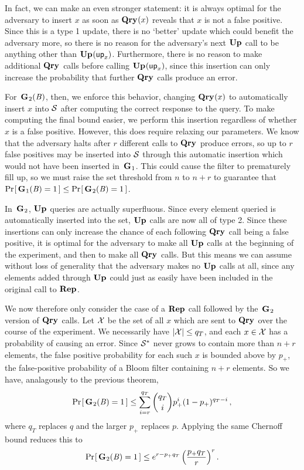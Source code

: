 In fact, we can make an even stronger statement: it is always optimal for the adversary to insert $x$ as soon as $\textup{\textbf{Qry}}\hspace{0.5pt}(x)$ reveals that $x$ is not a false positive. Since this is a type 1 update, there is no `better' update which could benefit the adversary more, so there is no reason for the adversary's next $\textup{\textbf{Up}}\hspace{0.5pt}$ call to be anything other than $\textup{\textbf{Up}}\hspace{0.5pt}(\mathsf{up}_x)$. Furthermore, there is no reason to make additional $\textup{\textbf{Qry}}\hspace{0.5pt}$ calls before calling $\textup{\textbf{Up}}\hspace{0.5pt}(\mathsf{up}_x)$, since this insertion can only increase the probability that further $\textup{\textbf{Qry}}\hspace{0.5pt}$ calls produce an error.

For~$\textup{\textbf{G}}\hspace{0.5pt}_2(\mathit{B})$, then, we enforce this behavior, changing $\textup{\textbf{Qry}}\hspace{0.5pt}(x)$ to automatically insert $x$ into $\mathcal{S}$ after computing the correct response to the query. To make computing the final bound easier, we perform this insertion regardless of whether $x$ is a false positive. However, this does require relaxing our parameters. We know that the adversary halts after $r$ different calls to $\textup{\textbf{Qry}}\hspace{0.5pt}$ produce errors, so up to $r$ false positives may be inserted into $\mathcal{S}$ through this automatic insertion which would not have been inserted in~$\textup{\textbf{G}}\hspace{0.5pt}_1$. This could cause the filter to prematurely fill up, so we must raise the set threshold from $n$ to $n+r$ to guarantee that $\Pr\hspace{-1pt}\left[\,\textup{\textbf{G}}\hspace{0.5pt}_1(\mathit{B}) = 1\,\right] \le \Pr\hspace{-1pt}\left[\,\textup{\textbf{G}}\hspace{0.5pt}_2(\mathit{B}) = 1\,\right]$.

In~$\textup{\textbf{G}}\hspace{0.5pt}_2$, $\textup{\textbf{Up}}\hspace{0.5pt}$ queries are actually superfluous. Since every element queried is automatically inserted into the set, $\textup{\textbf{Up}}\hspace{0.5pt}$ calls are now all of type 2. Since these insertions can only increase the chance of each following $\textup{\textbf{Qry}}\hspace{0.5pt}$ call being a false positive, it is optimal for the adversary to make all $\textup{\textbf{Up}}\hspace{0.5pt}$ calls at the beginning of the experiment, and then to make all $\textup{\textbf{Qry}}\hspace{0.5pt}$ calls. But this means we can assume without loss of generality that the adversary makes no $\textup{\textbf{Up}}\hspace{0.5pt}$ calls at all, since any elements added through $\textup{\textbf{Up}}\hspace{0.5pt}$ could just as easily have been included in the original call to $\textup{\textbf{Rep}}\hspace{0.5pt}$.

We now therefore only consider the case of a $\textup{\textbf{Rep}}\hspace{0.5pt}$ call followed by the~$\textup{\textbf{G}}\hspace{0.5pt}_2$ version of $\textup{\textbf{Qry}}\hspace{0.5pt}$ calls. Let $\mathcal{X}$ be the set of all $x$ which are sent to $\textup{\textbf{Qry}}\hspace{0.5pt}$ over the course of the experiment. We necessarily have $|\mathcal{X}| \le q_T$, and each $x \in \mathcal{X}$ has a probability of causing an error. Since $\mathcal{S}^*$ never grows to contain more than $n+r$ elements, the false positive probability for each such $x$ is bounded above by $p_+$, the false-positive probability of a Bloom filter containing $n+r$ elements. So we have, analagously to the previous theorem,
\begin{equation}
   \Pr\hspace{-1pt}\left[\,\textup{\textbf{G}}\hspace{0.5pt}_2(\mathit{B})=1\,\right] \le
     \sum_{i=r}^{q_T} \binom{q_T}{i}p_+^i(1-p_+)^{q_T-i} \,,
\end{equation}
where $q_T$ replaces $q$ and the larger $p_+$ replaces $p$. Applying the same Chernoff bound reduces this to
\begin{equation}
   \Pr\hspace{-1pt}\left[\,\textup{\textbf{G}}\hspace{0.5pt}_2(\mathit{B})=1\,\right] \le
     e^{r-p_+q_T}\left(\frac{p_+q_T}{r}\right)^r.
\end{equation}

